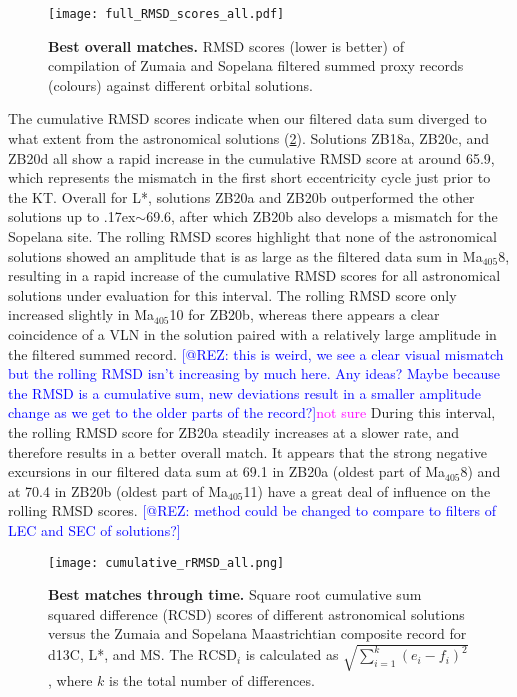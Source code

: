 \documentclass[draft]{agujournal2019}
\newcommand{\appr}{\raise.17ex\hbox{\(\scriptstyle\sim\)}} %
\newcommand{\ma}[1]{Ma\(_{405}\)#1} %
\newcommand{\rez}{\textcolor{magenta}}
\newcommand{\ijk}{\textcolor{blue}}
\begin{document}
\begin{figure}
    \centering
    \texttt{[image: full\_RMSD\_scores\_all.pdf]}
    \caption{\label{fig:full-RMSD-all} %
      \textbf{Best overall matches.}
        \Acrfull{RMSD} scores (lower is better) of compilation of Zumaia and Sopelana filtered summed proxy records (colours) against different orbital solutions.
    }
\end{figure}

The cumulative \gls{RMSD} scores indicate when our filtered data sum diverged to what extent from the astronomical solutions (\cref{fig:cum-RMSD-all}).
Solutions ZB18a, ZB20c, and ZB20d all show a rapid increase in the cumulative \gls{RMSD} score at around \qty{65.9}{\millionyearago}, which represents the mismatch in the first short eccentricity cycle just prior to the \gls{KT}.
Overall for \gls{L*}, solutions ZB20a and ZB20b outperformed the other solutions up to \appr\qty{69.6}{\millionyearago}, after which ZB20b also develops a mismatch for the Sopelana site.
The rolling \gls{RMSD} scores highlight that none of the astronomical solutions showed an amplitude that is as large as the filtered data sum in \ma{8}, resulting in a rapid increase of the cumulative \gls{RMSD} scores for all astronomical solutions under evaluation for this interval.
The rolling \gls{RMSD} score only increased slightly in \ma{10} for ZB20b, whereas there appears a clear coincidence of a \gls{VLN} in the solution paired with a relatively large amplitude in the filtered summed record.
\ijk{[@REZ: this is weird, we see a clear visual mismatch but the rolling RMSD isn't increasing by much here. Any ideas? Maybe because the RMSD is a cumulative sum, new deviations result in a smaller amplitude change as we get to the older parts of the record?]}\rez{not sure}
During this interval, the rolling \gls{RMSD} score for ZB20a steadily increases at a slower rate, and therefore results in a better overall match.
It appears that the strong negative excursions in our filtered data sum
at \qty{69.1}{\millionyearago} in ZB20a (oldest part of \ma{8})
and at \qty{70.4}{\millionyearago} in ZB20b (oldest part of \ma{11})
have a great deal of influence on the rolling \gls{RMSD} scores.
\ijk{[@REZ: method could be changed to compare to filters of LEC and SEC of solutions?]}

\begin{figure}
  \centering
  \texttt{[image: cumulative\_rRMSD\_all.png]}
  \caption{\label{fig:cum-RMSD-all}
    \textbf{Best matches through time.}
    Square root cumulative sum squared difference (RCSD) scores of
    different astronomical solutions versus the Zumaia and Sopelana Maastrichtian composite record
    for \gls{d13C}, \gls{L*}, and \gls{MS}.
    The \(\text{RCSD}_{i}\) is calculated as \(\sqrt{\sum_{i=1}^{k}(e_{i} - f_{i})^{2}}\), where \(k\) is the total number of differences.
  }
\end{figure}
\end{document}
